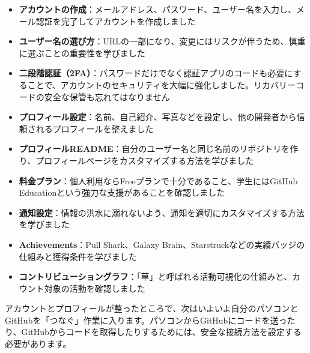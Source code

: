 \begin{itemize}
  \item \textbf{アカウントの作成}：メールアドレス、パスワード、ユーザー名を入力し、メール認証を完了してアカウントを作成しました
  \item \textbf{ユーザー名の選び方}：URLの一部になり、変更にはリスクが伴うため、慎重に選ぶことの重要性を学びました
  \item \textbf{二段階認証（2FA）}：パスワードだけでなく認証アプリのコードも必要にすることで、アカウントのセキュリティを大幅に強化しました。リカバリーコードの安全な保管も忘れてはなりません
  \item \textbf{プロフィール設定}：名前、自己紹介、写真などを設定し、他の開発者から信頼されるプロフィールを整えました
  \item \textbf{プロフィールREADME}：自分のユーザー名と同じ名前のリポジトリを作り、プロフィールページをカスタマイズする方法を学びました
  \item \textbf{料金プラン}：個人利用ならFreeプランで十分であること、学生にはGitHub Educationという強力な支援があることを確認しました
  \item \textbf{通知設定}：情報の洪水に溺れないよう、通知を適切にカスタマイズする方法を学びました
  \item \textbf{Achievements}：Pull Shark、Galaxy Brain、Starstruckなどの実績バッジの仕組みと獲得条件を学びました
  \item \textbf{コントリビューショングラフ}：「草」と呼ばれる活動可視化の仕組みと、カウント対象の活動を確認しました
\end{itemize}

アカウントとプロフィールが整ったところで、次はいよいよ自分のパソコンとGitHubを「つなぐ」作業に入ります。パソコンからGitHubにコードを送ったり、GitHubからコードを取得したりするためには、安全な接続方法を設定する必要があります。
